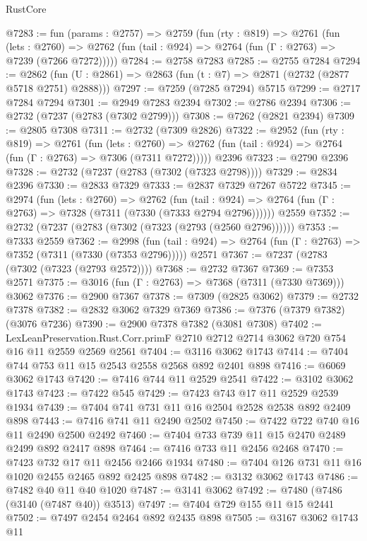 \begin{lexlean}{RustCore}
\begin{coremodule}
@7283 := fun (params : @2757) =>
  @2759
    (fun (rty : @819) =>
    @2761
      (fun (lets : @2760) =>
      @2762 (fun (tail : @924) => @2764 (fun (Γ : @2763) => @7239 (@7266 @7272)))))
@7284 := @2758 @7283
@7285 := @2755 @7284
@7294 := @2862 (fun (U : @2861) => @2863 (fun (t : @7) => @2871 (@2732 (@2877 @5718 @2751) @2888)))
@7297 := @7259 (@7285 @7294) @5715
@7299 := @2717 @7284 @7294
@7301 := @2949 @7283 @2394
@7302 := @2786 @2394
@7306 := @2732 (@7237 (@2783 (@7302 @2799)))
@7308 := @7262 (@2821 @2394)
@7309 := @2805 @7308
@7311 := @2732 (@7309 @2826)
@7322 := @2952
    (fun (rty : @819) =>
    @2761
      (fun (lets : @2760) =>
      @2762 (fun (tail : @924) => @2764 (fun (Γ : @2763) => @7306 (@7311 @7272)))))
    @2396
@7323 := @2790 @2396
@7328 := @2732 (@7237 (@2783 (@7302 (@7323 @2798))))
@7329 := @2834 @2396
@7330 := @2833 @7329
@7333 := @2837 @7329 @7267 @5722
@7345 := @2974
    (fun (lets : @2760) =>
    @2762
      (fun (tail : @924) => @2764 (fun (Γ : @2763) => @7328 (@7311 (@7330 (@7333 @2794 @2796))))))
    @2559
@7352 := @2732 (@7237 (@2783 (@7302 (@7323 (@2793 (@2560 @2796))))))
@7353 := @7333 @2559
@7362 := @2998
    (fun (tail : @924) => @2764 (fun (Γ : @2763) => @7352 (@7311 (@7330 (@7353 @2796)))))
    @2571
@7367 := @7237 (@2783 (@7302 (@7323 (@2793 @2572))))
@7368 := @2732 @7367
@7369 := @7353 @2571
@7375 := @3016 (fun (Γ : @2763) => @7368 (@7311 (@7330 @7369))) @3062
@7376 := @2900 @7367
@7378 := @7309 (@2825 @3062)
@7379 := @2732 @7378
@7382 := @2832 @3062 @7329 @7369
@7386 := @7376 (@7379 @7382) (@3076 @7236)
@7390 := @2900 @7378 @7382 (@3081 @7308)
@7402 := LexLeanPreservation.Rust.Corr.primF
    @2710
    @2712
    @2714
    @3062
    @720
    @754
    @16
    @11
    @2559
    @2569
    @2561
@7404 := @3116 @3062 @1743
@7414 := @7404 @744 @753 @11 @15 @2543 @2558 @2568 @892 @2401 @898
@7416 := @6069 @3062 @1743
@7420 := @7416 @744 @11 @2529 @2541
@7422 := @3102 @3062 @1743
@7423 := @7422 @545
@7429 := @7423 @743 @17 @11 @2529 @2539 @1934
@7439 := @7404 @741 @731 @11 @16 @2504 @2528 @2538 @892 @2409 @898
@7443 := @7416 @741 @11 @2490 @2502
@7450 := @7422 @722 @740 @16 @11 @2490 @2500 @2492
@7460 := @7404 @733 @739 @11 @15 @2470 @2489 @2499 @892 @2417 @898
@7464 := @7416 @733 @11 @2456 @2468
@7470 := @7423 @732 @17 @11 @2456 @2466 @1934
@7480 := @7404 @126 @731 @11 @16 @1020 @2455 @2465 @892 @2425 @898
@7482 := @3132 @3062 @1743
@7486 := @7482 @40 @11 @40 @1020
@7487 := @3141 @3062
@7492 := @7480 (@7486 (@3140 (@7487 @40)) @3513)
@7497 := @7404 @729 @155 @11 @15 @2441
@7502 := @7497 @2454 @2464 @892 @2435 @898
@7505 := @3167 @3062 @1743 @11

\end{coremodule}
\end{lexlean}
